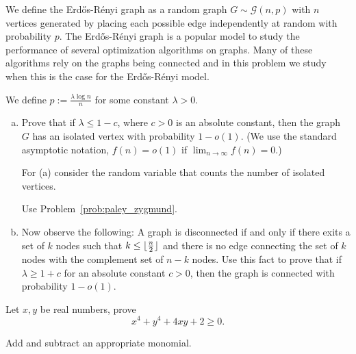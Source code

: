 \begin{myexercise}
    \label{prob:erdos_renyi_connectedness}

 


We define the Erd\H{o}s-R\'enyi graph as a random graph $G \sim \mathcal{G}(n,p)$ with $n$ vertices generated by placing each possible edge independently at random with probability $p$. The Erd\H{o}s-R\'enyi graph is a popular model to study the performance of several optimization algorithms on graphs. Many of these algorithms rely on the graphs being connected and in this problem we study when this is the case for the Erd\H{o}s-R\'enyi model.
 

We define $p:=\frac{\lambda\log n}{n}$ for some constant $\lambda >0$.

\begin{enumerate}[(a)]
    
    \item Prove that if $\lambda \le 1-c$, where $c>0$ is an absolute constant, then the graph $G$ has an isolated vertex with probability $1-o(1)$. (We use the standard asymptotic notation,  $f(n) = o(1)$ if $\lim_{n \rightarrow \infty}f(n) = 0$.)
    
    

    \begin{hint}
       For (a) consider the random variable that counts the number of isolated vertices.
    \end{hint}

    \begin{hint}
        Use Problem~\ref{prob:paley_zygmund}.
    \end{hint}
    
    \item Now observe the following: A graph is disconnected if and only if there exits a set of $k$ nodes such that $k\le \lfloor \frac{n}{2} \rfloor$ and there is no edge connecting the set of $k$ nodes with the complement set of $n-k$ nodes. Use this fact to prove that if $\lambda \ge 1+c$ for an absolute constant $c>0$, then the graph is connected with probability $1-o(1)$.
    
\end{enumerate}

\end{myexercise}

\begin{myexercise}
    \label{prob:sos_proof}
        Let $x,y$ be real numbers, prove
        $$ x^4 + y^4 + 4xy + 2 \geq 0.$$
        \begin{hint}
        Add and subtract an appropriate monomial.
    \end{hint}
\end{myexercise}

